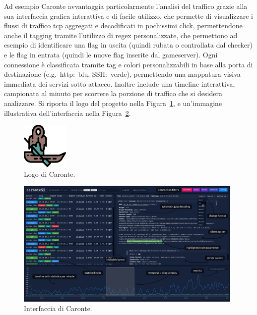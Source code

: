 Ad esempio Caronte avvantaggia particolarmente l'analisi del traffico grazie alla sua interfaccia grafica interattiva e di facile utilizzo, che permette di visualizzare i flussi di traffico \gls{tcp} aggregati e decodificati in pochissimi click, permettendone anche il tagging tramite l'utilizzo di \gls{regex} personalizzate, che permettono ad esempio di identificare una flag in uscita (quindi rubata o controllata dal checker) e le flag in entrata (quindi le nuove flag inserite dal gameserver). Ogni connessione è classificata tramite tag e colori personalizzabili in base alla porta di destinazione (e.g.\ \gls{http}:\ blu, SSH:\ verde), permettendo una mappatura visiva immediata dei servizi sotto attacco. Inoltre include una timeline interattiva, campionata al minuto per scorrere la porzione di traffico che si desidera analizzare.
Si riporta il logo del progetto nella Figura~\ref{fig:caronte_logo}, e un'immagine illustrativa dell'interfaccia nella Figura~\ref{fig:caronte_interface}.

\begin{figure}[H]
    \centering
    \includegraphics[width=0.2\textwidth]{images/chapter1/CaronteLogo.png}
    \caption{Logo di Caronte.}\label{fig:caronte_logo}
\end{figure}

\begin{figure}[H]
    \centering
    \includegraphics[width=0.98\textwidth]{images/chapter1/caronte_interface.png}
    \caption{Interfaccia di Caronte.}\label{fig:caronte_interface}
\end{figure}

